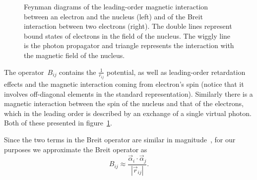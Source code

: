 \begin{figure}
  \centering  
{}
  \caption{Feynman diagrams of the leading-order magnetic interaction between an electron and the nucleus (left) and of the Breit interaction between two electrons (right). The double lines represent bound states of electrons in the field of the nucleus. The wiggly line is the photon propagator and triangle represents the interaction with the magnetic field of the nucleus.}
  \label{BreitFig}
\end{figure}

The operator~$B_{ij}$ contains the $\frac{1}{r_{ij}}$ potential, as well as leading-order retardation effects and the magnetic interaction coming from electron's spin (notice that it involves off-diagonal elements in the standard representation). Similarly there is a magnetic interaction between the spin of the nucleus and that of the electrons, which in the leading order is described by an exchange of a single virtual photon. Both of these presented in figure~\ref{BreitFig}.

Since the two terms in the Breit operator are similar in magnitude~\cite{00018737000101191}, for our purposes we approximate the Breit operator as
\begin{equation}
B_{ij} \approx \frac{\vec{\alpha}_i \cdot \vec{\alpha}_j}{|\vec{r}_{ij}|}.
\end{equation}


